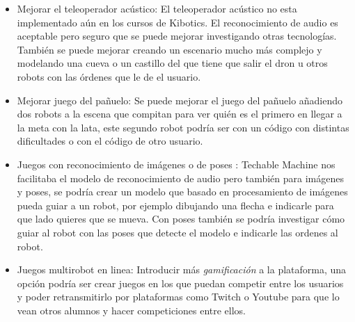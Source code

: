 \begin{itemize}
\item Mejorar el teleoperador acústico: El teleoperador acústico no esta implementado aún en los cursos de  Kibotics. El reconocimiento de audio es aceptable pero seguro que se puede mejorar investigando otras tecnologías. También se puede mejorar creando un escenario mucho más complejo y modelando una cueva o un castillo del que tiene que salir el dron u otros robots con las órdenes que le de el usuario.

\item Mejorar juego del pañuelo: Se puede mejorar el juego del pañuelo añadiendo dos robots a la escena que compitan para ver quién es el primero en llegar a la meta con la lata, este segundo robot podría ser con un código con distintas dificultades o con el código de otro usuario.

\item  Juegos con reconocimiento de imágenes o de poses : Techable Machine nos facilitaba el modelo de reconocimiento de audio pero también para imágenes y poses, se podría crear un modelo que basado en procesamiento de imágenes pueda guiar a un robot, por ejemplo dibujando una flecha e indicarle para que lado quieres que se mueva. Con poses también se podría investigar cómo guiar al robot con las poses que detecte el modelo e indicarle las ordenes al robot.

\item Juegos multirobot en linea: Introducir más \textit{gamificación} a la plataforma, una opción podría ser crear juegos en los que puedan competir entre los usuarios y poder retransmitirlo por plataformas como Twitch o Youtube para que lo vean otros alumnos y hacer competiciones entre ellos.


\end{itemize}
